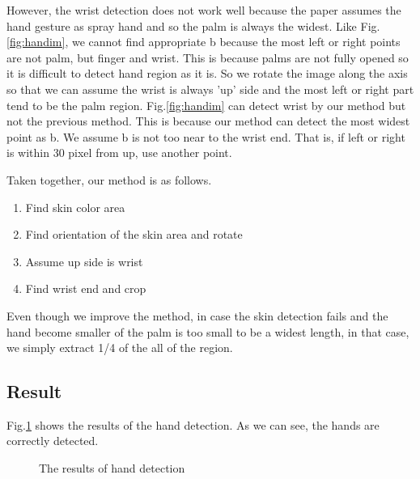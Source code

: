 \par
However, the wrist detection does not work well because the paper assumes the hand gesture as spray hand and so the palm is always the widest. Like Fig.\ref{fig:handim}, we cannot find appropriate b because the most left or right points are not palm, but finger and wrist.
This is because palms are not fully opened so it is difficult to detect hand region as it is. 
So we rotate the image along the axis so that we can assume the wrist is always 'up' side and the most left or right part tend to be the palm region.
Fig.\ref{fig:handim}  can detect wrist by our method but not the previous method. This is because our method can detect the most widest point as b. 
We assume b is not too near to the wrist end. That is, if left or right is within 30 pixel from up, use another point.

Taken together, our method is as follows.
\begin{enumerate}
  \item Find skin color area
  \item Find orientation of the skin area and rotate
  \item Assume up side is wrist
  \item Find wrist end and crop
\end{enumerate}

Even though we improve the method, in case the skin detection fails and the hand become smaller of the palm is too small to be a widest length, in that case, we simply extract 1/4 of the all of the region.
\subsection{Result}
Fig.\ref{fig:hands} shows the results of the hand detection.
As we can see, the hands are correctly detected.

\begin{landscape}
\begin{figure}[htbp]
 \centering
 
 \caption{The results of hand detection}
 \label{fig:hands}
\end{figure}
\end{landscape}
